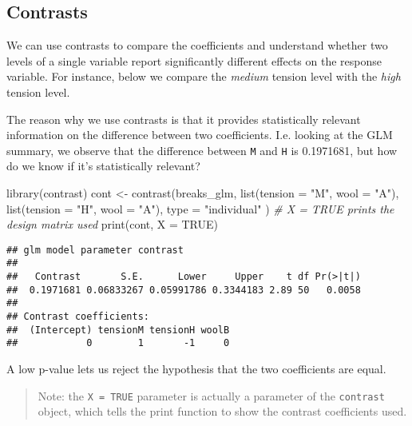 \documentclass[
  oneside]{book}
\newenvironment{Shaded}{\begin{snugshade}}{\end{snugshade}}
\newcommand{\AttributeTok}[1]{\textcolor[rgb]{0.77,0.63,0.00}{#1}}
\newcommand{\CommentTok}[1]{\textcolor[rgb]{0.56,0.35,0.01}{\textit{#1}}}
\newcommand{\ConstantTok}[1]{\textcolor[rgb]{0.00,0.00,0.00}{#1}}
\newcommand{\FunctionTok}[1]{\textcolor[rgb]{0.00,0.00,0.00}{#1}}
\newcommand{\NormalTok}[1]{#1}
\newcommand{\OtherTok}[1]{\textcolor[rgb]{0.56,0.35,0.01}{#1}}
\newcommand{\StringTok}[1]{\textcolor[rgb]{0.31,0.60,0.02}{#1}}
\begin{document}
\hypertarget{contrasts}{%
\subsection{Contrasts}\label{contrasts}}

We can use contrasts to compare the coefficients and
understand whether two levels of a single variable report
significantly different effects on the response variable.
For instance, below we compare the \emph{medium} tension level
with the \emph{high} tension level.

The reason why we use contrasts is that it provides
statistically relevant information on the difference between
two coefficients.
I.e. looking at the GLM summary, we observe that the difference
between \texttt{M} and \texttt{H} is 0.1971681,
but how do we know if it's statistically relevant?

\begin{Shaded}
\begin{Highlighting}[]
\FunctionTok{library}\NormalTok{(contrast)}
\NormalTok{cont }\OtherTok{\textless{}{-}} \FunctionTok{contrast}\NormalTok{(breaks\_glm,}
  \FunctionTok{list}\NormalTok{(}\AttributeTok{tension =} \StringTok{"M"}\NormalTok{, }\AttributeTok{wool =} \StringTok{"A"}\NormalTok{),}
  \FunctionTok{list}\NormalTok{(}\AttributeTok{tension =} \StringTok{"H"}\NormalTok{, }\AttributeTok{wool =} \StringTok{"A"}\NormalTok{),}
  \AttributeTok{type =} \StringTok{"individual"}
\NormalTok{)}
\CommentTok{\# X = TRUE prints the design matrix used}
\FunctionTok{print}\NormalTok{(cont, }\AttributeTok{X =} \ConstantTok{TRUE}\NormalTok{)}
\end{Highlighting}
\end{Shaded}

\begin{verbatim}
## glm model parameter contrast
## 
##   Contrast       S.E.      Lower     Upper    t df Pr(>|t|)
##  0.1971681 0.06833267 0.05991786 0.3344183 2.89 50   0.0058
## 
## Contrast coefficients:
##  (Intercept) tensionM tensionH woolB
##            0        1       -1     0
\end{verbatim}

A low p-value lets us reject the hypothesis that the two coefficients
are equal.

\begin{quote}
Note: the \texttt{X\ =\ TRUE} parameter is actually a parameter of the
\texttt{contrast} object, which tells the print function to show the
contrast coefficients used.
\end{quote}
\end{document}
